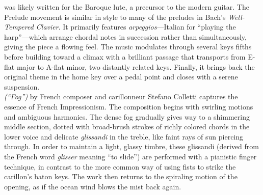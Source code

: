 \documentclass[11pt, letterpaper]{article}
\begin{document}
\begin{small}
     was likely written for the Baroque lute, a precursor to the modern guitar. The Prelude movement is similar in style to many of the preludes in Bach's \emph{Well-Tempered Clavier}. It primarily features \emph{arpeggios}---Italian for ``playing the harp''---which arrange chordal notes in succession rather than simultaneously, giving the piece a flowing feel. The music modulates through several keys fifths before building toward a climax with a brilliant passage that transports from E-flat major to A-flat minor, two distantly related keys. Finally, it brings back the original theme in the home key over a pedal point and closes with a serene suspension.\\[.2em]
     {\it (``Fog'')} by French composer and carillonneur Stefano Colletti captures the essence of French Impressionism. The composition begins with swirling motions and ambiguous harmonies. The dense fog gradually gives way to a shimmering middle section, dotted with broad-brush strokes of richly colored chords in the lower voice and delicate \emph{glissandi} in the treble, like faint rays of sun piercing through. In order to maintain a light, glassy timbre, these glissandi (derived from the French word \emph{glisser} meaning ``to slide'') are performed with a pianistic finger technique, in contrast to the more common way of using fists to strike the carillon's baton keys. The work then returns to the spiraling motion of the opening, as if the ocean wind blows the mist back again.

    \divider


\end{small}
\end{document}
